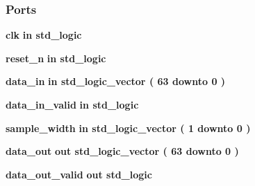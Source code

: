 \subsubsection*{Ports}
 \begin{DoxyCompactItemize}
\item 
{\bf clk}  {\bfseries {\bfseries \textcolor{keywordflow}{in}\textcolor{vhdlchar}{ }}} {\bfseries \textcolor{comment}{std\+\_\+logic}\textcolor{vhdlchar}{ }} 
\item 
{\bf reset\+\_\+n}  {\bfseries {\bfseries \textcolor{keywordflow}{in}\textcolor{vhdlchar}{ }}} {\bfseries \textcolor{comment}{std\+\_\+logic}\textcolor{vhdlchar}{ }} 
\item 
{\bf data\+\_\+in}  {\bfseries {\bfseries \textcolor{keywordflow}{in}\textcolor{vhdlchar}{ }}} {\bfseries \textcolor{comment}{std\+\_\+logic\+\_\+vector}\textcolor{vhdlchar}{ }\textcolor{vhdlchar}{(}\textcolor{vhdlchar}{ }\textcolor{vhdlchar}{ } \textcolor{vhdldigit}{63} \textcolor{vhdlchar}{ }\textcolor{keywordflow}{downto}\textcolor{vhdlchar}{ }\textcolor{vhdlchar}{ } \textcolor{vhdldigit}{0} \textcolor{vhdlchar}{ }\textcolor{vhdlchar}{)}\textcolor{vhdlchar}{ }} 
\item 
{\bf data\+\_\+in\+\_\+valid}  {\bfseries {\bfseries \textcolor{keywordflow}{in}\textcolor{vhdlchar}{ }}} {\bfseries \textcolor{comment}{std\+\_\+logic}\textcolor{vhdlchar}{ }} 
\item 
{\bf sample\+\_\+width}  {\bfseries {\bfseries \textcolor{keywordflow}{in}\textcolor{vhdlchar}{ }}} {\bfseries \textcolor{comment}{std\+\_\+logic\+\_\+vector}\textcolor{vhdlchar}{ }\textcolor{vhdlchar}{(}\textcolor{vhdlchar}{ }\textcolor{vhdlchar}{ } \textcolor{vhdldigit}{1} \textcolor{vhdlchar}{ }\textcolor{keywordflow}{downto}\textcolor{vhdlchar}{ }\textcolor{vhdlchar}{ } \textcolor{vhdldigit}{0} \textcolor{vhdlchar}{ }\textcolor{vhdlchar}{)}\textcolor{vhdlchar}{ }} 
\item 
{\bf data\+\_\+out}  {\bfseries {\bfseries \textcolor{keywordflow}{out}\textcolor{vhdlchar}{ }}} {\bfseries \textcolor{comment}{std\+\_\+logic\+\_\+vector}\textcolor{vhdlchar}{ }\textcolor{vhdlchar}{(}\textcolor{vhdlchar}{ }\textcolor{vhdlchar}{ } \textcolor{vhdldigit}{63} \textcolor{vhdlchar}{ }\textcolor{keywordflow}{downto}\textcolor{vhdlchar}{ }\textcolor{vhdlchar}{ } \textcolor{vhdldigit}{0} \textcolor{vhdlchar}{ }\textcolor{vhdlchar}{)}\textcolor{vhdlchar}{ }} 
\item 
{\bf data\+\_\+out\+\_\+valid}  {\bfseries {\bfseries \textcolor{keywordflow}{out}\textcolor{vhdlchar}{ }}} {\bfseries \textcolor{comment}{std\+\_\+logic}\textcolor{vhdlchar}{ }} 
\end{DoxyCompactItemize}


